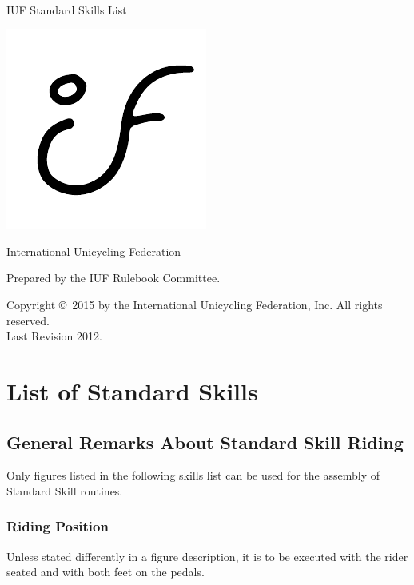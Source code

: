 


\begin{titlepage}
\centering
\ \\
\vspace{5cm}
{\Huge IUF Standard Skills List}
\vspace{5mm}

\includegraphics{../img/iuf-logo}

\vspace{5mm}
{\huge International Unicycling Federation}

\vspace{70mm}
Prepared by the IUF Rulebook Committee.

\vspace{5mm}
{\small Copyright \copyright\ 2015 by the International Unicycling Federation, Inc. All rights reserved.} \\
\small{Last Revision 2012.}

\end{titlepage}

\setcounter{chapter}{5}\setcounter{part}{6}
\chapter{List of Standard Skills \label{chap:freestyle_std-skills-list}}

\section{General Remarks About Standard Skill Riding  }
Only figures listed in the following skills list can be used for the assembly of Standard Skill routines.

\subsection{Riding Position}
Unless stated differently in a figure description, it is to be executed with the rider seated and with both feet on the pedals.

